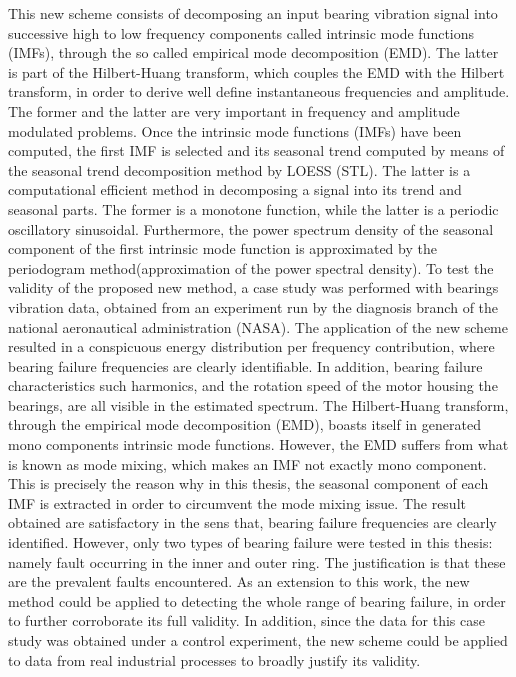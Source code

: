 \documentclass[../Main/thesis.tex]{subfiles}
\begin{document}
	This new scheme consists of decomposing an input bearing vibration signal into successive high to low frequency components called intrinsic mode functions (IMFs), through the so called empirical mode decomposition (EMD). The latter is part of the Hilbert-Huang transform, which couples the EMD with the Hilbert transform, in order to derive well define instantaneous frequencies and amplitude. The former and the latter are very important in frequency and amplitude modulated problems.
	\justify
	Once the intrinsic mode functions (IMFs) have been computed, the first IMF is selected and its seasonal trend computed by means of the seasonal trend decomposition method by LOESS (STL). The latter is a computational efficient method in decomposing a signal into its trend and seasonal parts. The former is a monotone function, while the latter is a periodic oscillatory sinusoidal. Furthermore, the power spectrum density of the seasonal component of the first intrinsic mode function is approximated by the periodogram method(approximation of the power spectral density).
	\justify
	To test the validity of the proposed new method, a case study was performed with bearings vibration data, obtained from an experiment run by the diagnosis branch of the national aeronautical administration (NASA). The application of the new scheme resulted in a conspicuous energy distribution per frequency contribution, where bearing failure frequencies are clearly identifiable. In addition, bearing failure characteristics such harmonics, and the rotation speed of the motor housing the bearings, are all visible in the estimated spectrum.
	\justify
	The Hilbert-Huang transform, through the empirical mode decomposition (EMD), boasts itself in generated mono components intrinsic mode functions. However, the EMD suffers from what is known as mode mixing, which makes an IMF not exactly mono component. This is precisely the reason why in this thesis, the seasonal component of each IMF is extracted in order to circumvent the mode mixing issue.
	\justify
	The result obtained are satisfactory in the sens that, bearing failure frequencies are clearly identified. However, only two types of bearing failure were tested in this thesis: namely fault occurring in the inner and outer ring. The justification is that these are the prevalent faults encountered. As an extension to this work, the new method could be applied to detecting the whole range of bearing failure, in order to further corroborate its full validity. In addition, since the data for this case study was obtained under a control experiment, the new scheme could be applied to data from real industrial processes to broadly justify its validity.

	
\end{document}
